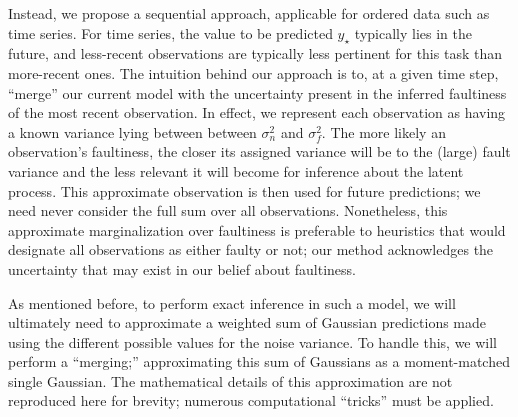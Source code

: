 \documentclass{article}
\newcommand{\st}{_{\star}}
\begin{document}
Instead, we propose a sequential approach, applicable for ordered data
such as time series. For time series, the value to be predicted $y\st$
typically lies in the future, and less-recent observations are
typically less pertinent for this task than more-recent ones. The
intuition behind our approach is to, at a given time step, ``merge''
our current model with the uncertainty present in the inferred
faultiness of the most recent observation. In effect, we represent
each observation as having a known variance lying between between
$\sigma_n^2$ and $\sigma_f^2$. The more likely an observation's
faultiness, the closer its assigned variance will be to the (large)
fault variance and the less relevant it will become for inference
about the latent process. This approximate observation is then used
for future predictions; we need never consider the full sum over all
observations. Nonetheless, this approximate marginalization over
faultiness is preferable to heuristics that would designate all
observations as either faulty or not; our method acknowledges the
uncertainty that may exist in our belief about faultiness.

As mentioned before, to perform exact inference in such a model, we
will ultimately need to approximate a weighted sum of Gaussian
predictions made using the different possible values for the noise
variance.  To handle this, we will perform a ``merging;''
approximating this sum of Gaussians as a moment-matched single
Gaussian.  The mathematical details of this approximation are not
reproduced here for brevity; numerous computational ``tricks'' must be
applied.
\end{document}
